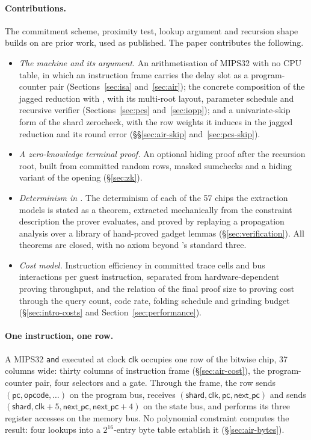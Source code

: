 \paragraph{Contributions.} The commitment scheme, proximity test, lookup argument and recursion shape \Ziren{} builds on are prior work, used as published. The paper contributes the following.
\begin{itemize}
\item \emph{The machine and its argument.} An arithmetisation of MIPS32 with no CPU table, in which an instruction frame carries the delay slot as a program-counter pair (Sections~\ref{sec:isa} and~\ref{sec:air}); the concrete composition of the jagged reduction with \WHIR{}, with its multi-root layout, parameter schedule and recursive verifier (Sections~\ref{sec:pcs} and~\ref{sec:iopp}); and a univariate-skip form of the shard zerocheck, with the row weights it induces in the jagged reduction and its round error (\S\S\ref{sec:air-skip} and~\ref{sec:pcs-skip}).
\item \emph{A zero-knowledge terminal proof.} An optional hiding proof after the recursion root, built from committed random rows, masked sumchecks and a hiding variant of the \WHIR{} opening (\S\ref{sec:zk}).
\item \emph{Determinism in \Lean{}.} The determinism of each of the 57 chips the extraction models is stated as a \Lean{} theorem, extracted mechanically from the constraint description the prover evaluates, and proved by replaying a propagation analysis over a library of hand-proved gadget lemmas (\S\ref{sec:verification}). All \ndettotal{} theorems are closed, with no axiom beyond \Lean{}'s standard three.
\item \emph{Cost model.} Instruction efficiency in committed trace cells and bus interactions per guest instruction, separated from hardware-dependent proving throughput, and the relation of the final proof size to proving cost through the query count, code rate, folding schedule and grinding budget (\S\ref{sec:intro-costs} and Section~\ref{sec:performance}).
\end{itemize}

\paragraph{One instruction, one row.}\label{sec:techniques} A MIPS32 \texttt{and} executed at clock $\mathsf{clk}$ occupies one row of the bitwise chip, 37 columns wide: thirty columns of instruction frame (\S\ref{sec:air-cost}), the program-counter pair, four selectors and a gate. Through the frame, the row sends $(\mathsf{pc}, \mathsf{opcode}, \ldots)$ on the program bus, receives $(\mathsf{shard}, \mathsf{clk}, \mathsf{pc}, \mathsf{next\_pc})$ and sends $(\mathsf{shard}, \mathsf{clk}+5, \mathsf{next\_pc}, \mathsf{next\_pc}+4)$ on the state bus, and performs its three register accesses on the memory bus. No polynomial constraint computes the result: four lookups into a $2^{16}$-entry byte table establish it (\S\ref{sec:air-bytes}).


